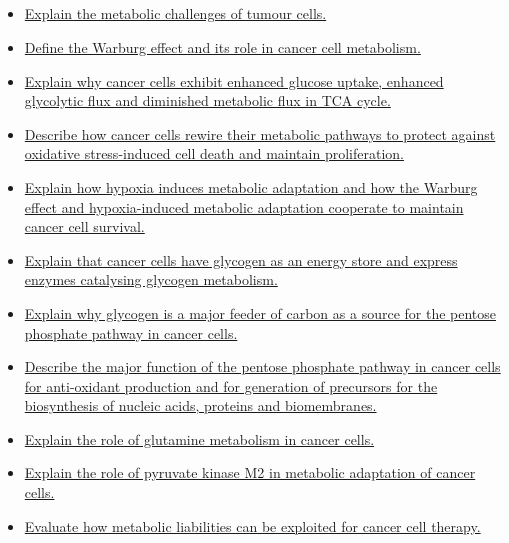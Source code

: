 \documentclass[10pt, a4paper]{article}
\newcommand{\MYhref}[3][blue]{\href{#2}{\color{#1}{#3}}}%
\begin{document}
\subsection{\MYhref[melbBlue]{https://notion.so/17bcbc83cdae40eaad8637886876475d}{Metabolic Adaptations of Cancer Cells}} \begin{itemize} \item \href{https://www.notion.so/d4ce381b7f534a148ee55eb9997128b8}{Explain the metabolic challenges of tumour cells.} \item \href{https://www.notion.so/a3130a0aa79e491dbf60bf40fa484833}{Define the Warburg effect and its role in cancer cell metabolism.} \item \href{https://www.notion.so/8656074ac53049cca19f2e91662f26c5}{Explain why cancer cells exhibit enhanced glucose uptake, enhanced glycolytic flux and diminished metabolic flux in TCA cycle.} \item \href{https://www.notion.so/51f319d1358a4b6c8a831bd24d8d954b}{Describe how cancer cells rewire their metabolic pathways to protect against oxidative stress-induced cell death and maintain proliferation.} \item \href{https://www.notion.so/3d80a13f951642b08d0494523115d609}{Explain how hypoxia induces metabolic adaptation and how the Warburg effect and hypoxia-induced metabolic adaptation cooperate to maintain cancer cell survival.} \item \href{https://www.notion.so/12c6c8d328c6453d947e74647293bc26}{Explain that cancer cells have glycogen as an energy store and express enzymes catalysing glycogen metabolism.} \item \href{https://www.notion.so/b4bbdf935a0f467f903c88e87f7cb202}{Explain why glycogen is a major feeder of carbon as a source for the pentose phosphate pathway in cancer cells.} \item \href{https://www.notion.so/73bee1bd9c4b4ff7a26b89f7a1a94cbc}{Describe the major function of the pentose phosphate pathway in cancer cells for anti-oxidant production and for generation of precursors for the biosynthesis of nucleic acids, proteins and biomembranes.} \item \href{https://www.notion.so/00acb2a29d454c3fb5206e0dd05f5482}{Explain the role of glutamine metabolism in cancer cells.} \item \href{https://www.notion.so/06c16b8cec9f4a1ba32fb1301408eab8}{Explain the role of pyruvate kinase M2 in metabolic adaptation of cancer cells.} \item \href{https://www.notion.so/85945f627f9748adbb9ce66e1b580ee0}{Evaluate how metabolic liabilities can be exploited for cancer cell therapy.} \end{itemize}
\end{document}
